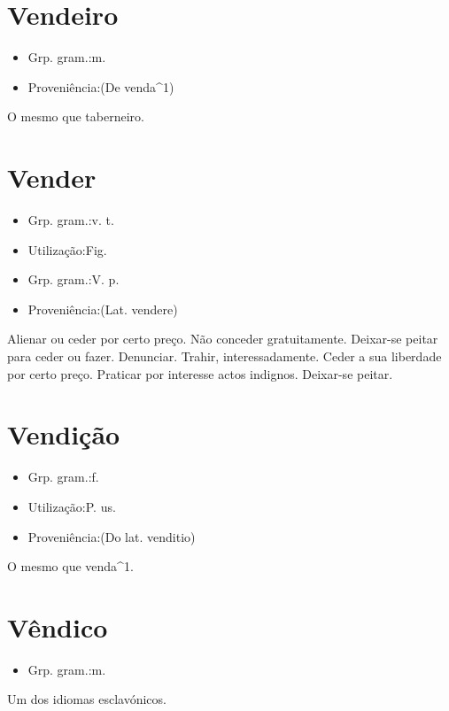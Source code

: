 \documentclass{article}
\begin{document}
\section{Vendeiro}
\begin{itemize}
\item {Grp. gram.:m.}
\end{itemize}
\begin{itemize}
\item {Proveniência:(De \textunderscore venda\textunderscore ^1)}
\end{itemize}
O mesmo que \textunderscore taberneiro\textunderscore .
\section{Vender}
\begin{itemize}
\item {Grp. gram.:v. t.}
\end{itemize}
\begin{itemize}
\item {Utilização:Fig.}
\end{itemize}
\begin{itemize}
\item {Grp. gram.:V. p.}
\end{itemize}
\begin{itemize}
\item {Proveniência:(Lat. \textunderscore vendere\textunderscore )}
\end{itemize}
Alienar ou ceder por certo preço.
Não conceder gratuitamente.
Deixar-se peitar para ceder ou fazer.
Denunciar.
Trahir, interessadamente.
Ceder a sua liberdade por certo preço.
Praticar por interesse actos indignos.
Deixar-se peitar.
\section{Vendição}
\begin{itemize}
\item {Grp. gram.:f.}
\end{itemize}
\begin{itemize}
\item {Utilização:P. us.}
\end{itemize}
\begin{itemize}
\item {Proveniência:(Do lat. \textunderscore venditio\textunderscore )}
\end{itemize}
O mesmo que \textunderscore venda\textunderscore ^1.
\section{Vêndico}
\begin{itemize}
\item {Grp. gram.:m.}
\end{itemize}
Um dos idiomas esclavónicos.
\end{document}
